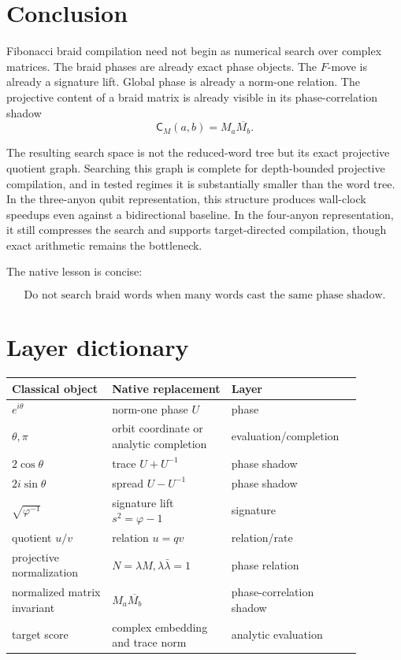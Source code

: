\documentclass[11pt]{article}
\newcommand{\ph}{\varphi}
\newcommand{\shadow}{\mathsf C}
\begin{document}
\section{Conclusion}

Fibonacci braid compilation need not begin as numerical search over complex matrices.  The braid phases are already exact phase objects.  The $F$-move is already a signature lift.  Global phase is already a norm-one relation.  The projective content of a braid matrix is already visible in its phase-correlation shadow
\[
    \shadow_M(a,b)=M_a\overline{M_b}.
\]

The resulting search space is not the reduced-word tree but its exact projective quotient graph.  Searching this graph is complete for depth-bounded projective compilation, and in tested regimes it is substantially smaller than the word tree.  In the three-anyon qubit representation, this structure produces wall-clock speedups even against a bidirectional baseline.  In the four-anyon representation, it still compresses the search and supports target-directed compilation, though exact arithmetic remains the bottleneck.

The native lesson is concise:

\[
    \boxed{\text{Do not search braid words when many words cast the same phase shadow.}}
\]

\appendix

\section{Layer dictionary}

\begin{center}
\small
\begin{tabular}{p{0.26\linewidth}p{0.31\linewidth}p{0.31\linewidth}}
\toprule
Classical object & Native replacement & Layer \\
\midrule
$e^{i\theta}$ & norm-one phase $U$ & phase \\
$\theta,\pi$ & orbit coordinate or analytic completion & evaluation/completion \\
$2\cos\theta$ & trace $U+U^{-1}$ & phase shadow \\
$2i\sin\theta$ & spread $U-U^{-1}$ & phase shadow \\
$\sqrt{\ph^{-1}}$ & signature lift $s^2=\ph-1$ & signature \\
quotient $u/v$ & relation $u=qv$ & relation/rate \\
projective normalization & $N=\lambda M,\lambda\bar\lambda=1$ & phase relation \\
normalized matrix invariant & $M_a\overline{M_b}$ & phase-correlation shadow \\
target score & complex embedding and trace norm & analytic evaluation \\
\bottomrule
\end{tabular}
\end{center}
\end{document}
